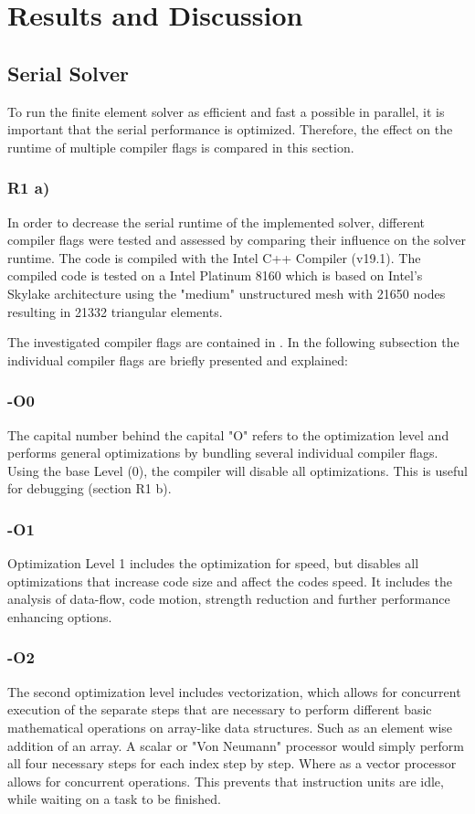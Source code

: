 \section{Results and Discussion}

\subsection{Serial Solver \label{sec:Serial}}

To run the finite element solver as efficient and fast a possible in parallel, it is important that the serial performance is optimized. Therefore, the effect on the runtime of multiple compiler flags is compared in this section.

\subsubsection{R1 a)}
In order to decrease the serial runtime of the implemented solver, different compiler flags were tested and assessed by comparing their influence on the solver runtime. The code is compiled with the Intel C++ Compiler (v19.1). The compiled code is tested on a Intel Platinum 8160 which is based on Intel's Skylake architecture using the "medium" unstructured mesh with 21650 nodes resulting in 21332 triangular elements.

The investigated compiler flags are contained in .
In the following subsection the individual compiler flags are briefly presented and explained: 

\subsubsection*{-O0}
The capital number behind the capital "O" refers to the optimization level and performs general optimizations by bundling several individual compiler flags. Using the base Level (0),  the compiler will disable all optimizations. This is useful for debugging (section R1 b).

\subsubsection*{-O1}
Optimization Level 1 includes the optimization for speed, but disables all optimizations that increase code size and affect the codes speed. It includes the analysis of data-flow, code motion, strength reduction and further performance enhancing options.

\subsubsection*{-O2}
The second optimization level includes vectorization, which allows for concurrent execution of the separate steps that are necessary to perform different basic mathematical operations on array-like data structures. Such as an element wise addition of an array. A scalar or "Von Neumann" processor would simply perform all four necessary steps for each index step by step. Where as a vector processor allows for concurrent operations. This prevents that instruction units are idle, while waiting on a task to be finished.

